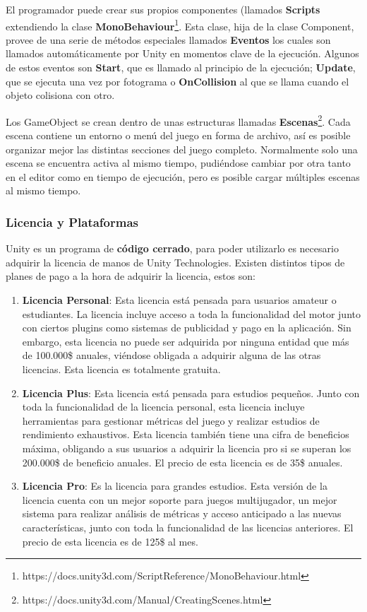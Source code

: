 El programador puede crear sus propios componentes (llamados \textbf{Scripts} extendiendo la clase \textbf{MonoBehaviour}\footnote{https://docs.unity3d.com/ScriptReference/MonoBehaviour.html}. Esta clase, hija de la clase Component, provee de una serie de métodos especiales llamados \textbf{Eventos} los cuales son llamados automáticamente por Unity en momentos clave de la ejecución. Algunos de estos eventos son \textbf{Start}, que es llamado al principio de la ejecución; \textbf{Update}, que se ejecuta una vez por fotograma o \textbf{OnCollision} al que se llama cuando el objeto colisiona con otro. 

Los GameObject se crean dentro de unas estructuras llamadas \textbf{Escenas}\footnote{https://docs.unity3d.com/Manual/CreatingScenes.html}. Cada escena contiene un entorno o menú del juego en forma de archivo, así es posible organizar mejor las distintas secciones del juego completo. Normalmente solo una escena se encuentra activa al mismo tiempo, pudiéndose cambiar por otra tanto en el editor como en tiempo de ejecución, pero es posible cargar múltiples escenas al mismo tiempo.

\subsubsection{Licencia y Plataformas}
Unity es un programa de \textbf{código cerrado}, para poder utilizarlo es necesario adquirir la licencia de manos de Unity Technologies. Existen distintos tipos de planes de pago a la hora de adquirir la licencia, estos son:
\begin{enumerate}
\item\textbf{Licencia Personal}: Esta licencia está pensada para usuarios amateur o estudiantes. La licencia incluye acceso a toda la funcionalidad del motor junto con ciertos plugins como sistemas de publicidad y pago en la aplicación. Sin embargo, esta licencia no puede ser adquirida por ninguna entidad que más de 100.000\$ anuales, viéndose obligada a adquirir alguna de las otras licencias. Esta licencia es totalmente gratuita. 
\item\textbf{Licencia Plus}: Esta licencia está pensada para estudios pequeños. Junto con toda la funcionalidad de la licencia personal, esta licencia incluye herramientas para gestionar métricas del juego y realizar estudios de rendimiento exhaustivos. Esta licencia también tiene una cifra de beneficios máxima, obligando a sus usuarios a adquirir la licencia pro si se superan los 200.000\$ de beneficio anuales. El precio de esta licencia es de 35\$ anuales.
\item\textbf{Licencia Pro}: Es la licencia para grandes estudios. Esta versión de la licencia cuenta con un mejor soporte para juegos multijugador, un mejor sistema para realizar análisis de métricas y acceso anticipado a las nuevas características, junto con toda la funcionalidad de las licencias anteriores. El precio de esta licencia es de 125\$ al mes.
\end{enumerate}

